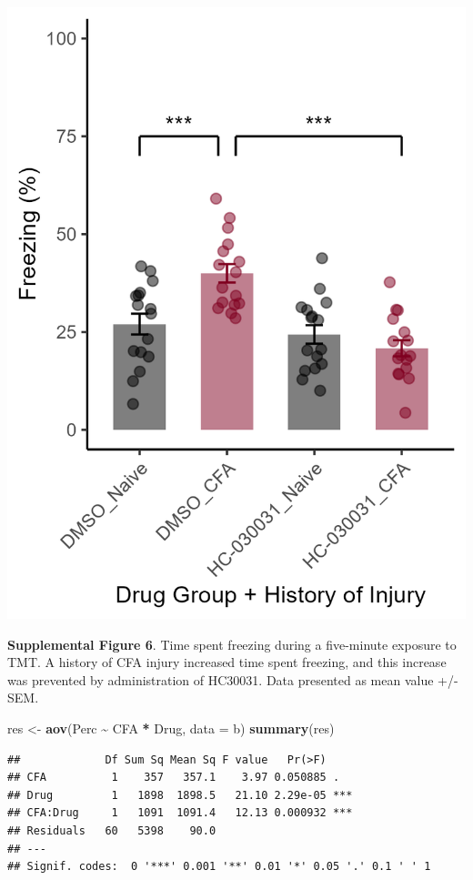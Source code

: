 \documentclass[
]{book}
\newenvironment{Shaded}{\begin{snugshade}}{\end{snugshade}}
\newcommand{\AttributeTok}[1]{\textcolor[rgb]{0.13,0.29,0.53}{#1}}
\newcommand{\FunctionTok}[1]{\textcolor[rgb]{0.13,0.29,0.53}{\textbf{#1}}}
\newcommand{\NormalTok}[1]{#1}
\newcommand{\OtherTok}[1]{\textcolor[rgb]{0.56,0.35,0.01}{#1}}
\newcommand{\SpecialCharTok}[1]{\textcolor[rgb]{0.81,0.36,0.00}{\textbf{#1}}}
\begin{document}
\includegraphics[width=12.5in]{Figs/S6_DMSO_compare}

\textbf{Supplemental Figure 6}. Time spent freezing during a five-minute exposure to TMT. A history of CFA injury increased time spent freezing, and this increase was prevented by administration of HC30031. Data presented as mean value +/- SEM.

\begin{Shaded}
\begin{Highlighting}[]
\NormalTok{res }\OtherTok{\textless{}{-}} \FunctionTok{aov}\NormalTok{(Perc }\SpecialCharTok{\textasciitilde{}}\NormalTok{ CFA }\SpecialCharTok{*}\NormalTok{ Drug, }\AttributeTok{data =}\NormalTok{ b)}
\FunctionTok{summary}\NormalTok{(res)}
\end{Highlighting}
\end{Shaded}

\begin{verbatim}
##             Df Sum Sq Mean Sq F value   Pr(>F)    
## CFA          1    357   357.1    3.97 0.050885 .  
## Drug         1   1898  1898.5   21.10 2.29e-05 ***
## CFA:Drug     1   1091  1091.4   12.13 0.000932 ***
## Residuals   60   5398    90.0                     
## ---
## Signif. codes:  0 '***' 0.001 '**' 0.01 '*' 0.05 '.' 0.1 ' ' 1
\end{verbatim}
\end{document}
